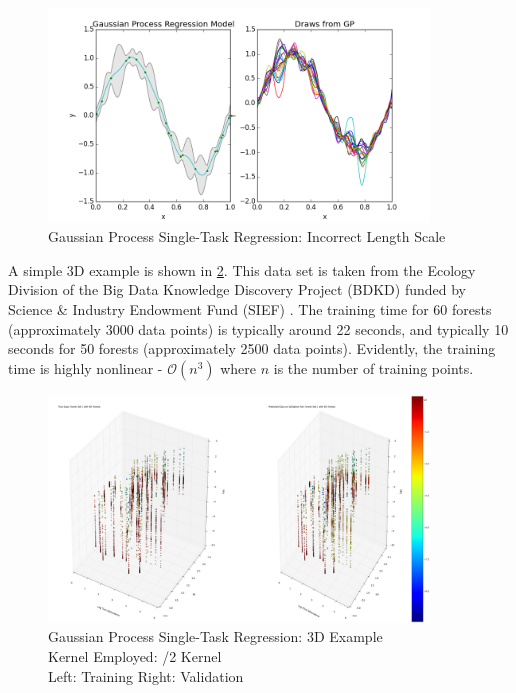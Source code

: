 				\begin{figure}[!htbp]
					\centering
						\includegraphics[width=0.9\textwidth]{Figures/Progress/regressionbad.png}
					\caption{Gaussian Process Single-Task Regression: Incorrect Length Scale}
					\label{ProgressReport:GaussianProcessModels:Figure:regressionbad}
				\end{figure}

				\FloatBarrier
				
				A simple 3D example is shown in \cref{ProgressReport:GaussianProcessModels:Figure:gpr_3D}. This data set is taken from the Ecology Division of the Big Data Knowledge Discovery Project (BDKD) funded by Science \& Industry Endowment Fund (SIEF) \cite{BDKD}. The training time for 60 forests (approximately 3000 data points) is typically around 22 seconds, and typically 10 seconds for 50 forests (approximately 2500 data points). Evidently, the training time is highly nonlinear - $\mathcal{O}(n^{3})$ where $n$ is the number of training points.
				
				\begin{figure}[!htbp]
					\centering
						\includegraphics[width=0.9\textwidth]{Figures/Progress/gpr_3D.png}
					\caption{Gaussian Process Single-Task Regression: 3D Example \\
					Kernel Employed: /2 Kernel \\
					Left: Training \qquad \qquad \qquad \qquad \qquad Right: Validation}
					\label{ProgressReport:GaussianProcessModels:Figure:gpr_3D}
				\end{figure}
				
